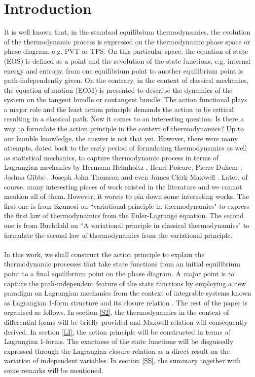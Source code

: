 \documentclass[12pt]{article}
\numberwithin{equation}{section}
\theoremstyle{remark}
\theoremstyle{definition}
\begin{document}
	\section{Introduction}\label{S1}
	It is well known that, in the standard equilibrium thermodynamics, the evolution of the thermodynamic process is expressed on the thermodynamic phase space or phase diagram, e.g. PVT or TPS. On this particular space, the equation of state (EOS) is defined as a point and the revolution of the state functions, e.g. internal energy and entropy, from one equilibrium point to another equilibrium point is path-independently given. On the contrary, in the context of classical mechanics, the equation of motion (EOM) is presented to describe the dynamics of the system on the tangent bundle or contangent bundle. The action functional plays a major role and the least action principle demands the action to be critical resulting in a classical path. Now it comes to an interesting question: Is there a way to formulate the action principle in the context of thermodynamics? Up to our humble knowledge, the answer is not that yet. However, there were many attempts, dated back to the early period of formulating thermodynamics as well as statistical mechanics, to capture thermodynamic process in terms of Lagrangian mechanics by Hermann Helmholtz \cite{Helm1,Helm2}, Henri Poicare, Pierre Duhem \cite{D1,D2,D3,D4,D5}, Joshua Gibbs \cite{Gibbs1,Gibbs2,Gibbs3}, Joseph John Thomson \cite{Thomson} and even James Clerk Maxwell \cite{M1,M2}. Later, of course, many interesting pieces of work existed in the literature and we cannot mention all of them. However, it worsts to pin down some interesting works. The first one is from Szamosi on ``variational principle in thermodynamics" \cite{GS} to express the first law of thermodynamics from the Euler-Lagrange equation. The second one is from Buchdahl on ``A variational principle in classical thermodynamics" \cite{B} to formulate the second law of thermodynamics from the variational principle.
 \\
 \\
 In this work, we shall construct the action principle to explain the thermodynamic processes that take state functions from an initial equilibrium point to a final equilibrium point on the phase diagram. A major point is to capture the path-independent feature of the state functions by employing a new paradigm on Lagrangian mechanics from the context of integrable systems known as Lagrangian 1-form structure and its closure relation \cite{Frank}. The rest of the paper is organised as follows. In section \ref{S2}, the thermodynamics in the context of differential forms will be briefly provided and Maxwell relation will consequently derived. In section \ref{LI}, the action principle will be constructed in terms of Lagrangian 1-forms. The exactness of the state functions will be disguisedly expressed through the Lagrangian closure relation as a direct result on the variation of independent variables. In section \ref{SS}, the summary together with some remarks will be mentioned.
\end{document}
